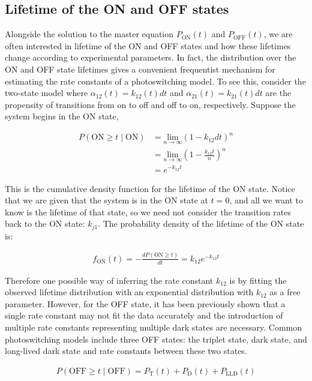 \documentclass{ucetd}
\begin{document}
\begin{appendices}
\subsection{Lifetime of the ON and OFF states}

Alongside the solution to the master equation $P_{\mathrm{ON}}(t)$ and $P_{\mathrm{OFF}}(t)$, we are often interested in lifetime of the ON and OFF states and how these lifetimes change according to experimental parameters. In fact, the distribution over the ON and OFF state lifetimes gives a convenient frequentist mechanism for estimating the rate constants of a photoswitching model. To see this, consider the two-state model where $\alpha_{12}(t) = k_{12}(t)dt$ and $\alpha_{21}(t) = k_{21}(t)dt$ are the propensity of transitions from on to off and off to on, respectively. Suppose the system begins in the ON state, 

\begin{align*}
P(\mathrm{ON} \geq t \; | \;\mathrm{ON}) &= \underset{n\rightarrow\infty}{\mathrm{lim}}\left(1-k_{12}dt\right)^{n}\\
&= \underset{n\rightarrow\infty}{\mathrm{lim}}\left(1-\frac{k_{12}t}{n}\right)^{n}\\
&= e^{-k_{12}t}
\end{align*}

This is the cumulative density function for the lifetime of the ON state. Notice that we are given that the system is in the ON state at $t=0$, and all we want to know is the lifetime of that state, so we need not consider the transition rates back to the ON state: $k_{j1}$. The probability density of the lifetime of the ON state is: 

\begin{align*}
f_{\mathrm{ON}}(t) = -\frac{dP(\mathrm{ON} \geq t)}{dt} = k_{12}e^{-k_{12}t}
\end{align*}

Therefore one possible way of inferring the rate constant $k_{12}$ is by fitting the observed lifetime distribution with an exponential distribution with $k_{12}$ as a free parameter. However, for the OFF state, it has been previously shown that a single rate constant may not fit the data accurately and the introduction of multiple rate constants representing multiple dark states are necessary. Common photoswitching models include three OFF states: the triplet state, dark state, and long-lived dark state and rate constants between these two states.

\begin{align*}
P(\mathrm{OFF} \geq t\; | \; \mathrm{OFF}) = P_{\mathrm{T}}(t) + P_{\mathrm{D}}(t) + P_{\mathrm{LLD}}(t)
\end{align*}


\end{appendices}
\end{document}
